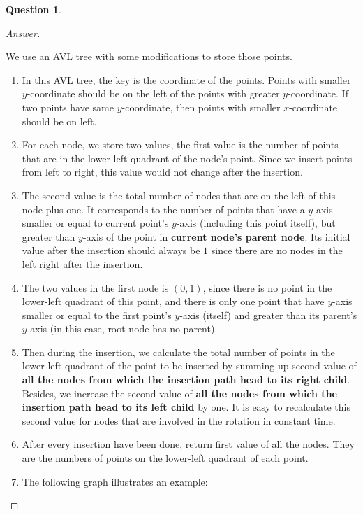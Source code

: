 \documentclass{article}
\theoremstyle{plain}
\newtheorem{question}{Question}
\newenvironment{answer}[1][Answer]
    {\begin{proof}[#1]{$ $}\renewcommand\qedsymbol{$\vartriangle$}}
    {\end{proof}}
\begin{document}
\begin{question}
\end{question}
\begin{answer}
    \begin{enumerate}
    We use an AVL tree with some modifications to store those points.
        \begin{enumerate}
            \item
            In this AVL tree, the key is the coordinate of the points. Points with smaller $y$-coordinate should be on the left of the points with greater $y$-coordinate. If two points have same $y$-coordinate, then points with smaller $x$-coordinate should be on left.
            \item For each node, we store two values, the first value is the number of points that are in the lower left quadrant of the node's point. Since we insert points from left to right, this value would not change after the insertion.
            \item The second value is the total number of nodes that are on the left of this node plus one. It corresponds to the number of points that have a $y$-axis smaller or equal to current point's $y$-axis (including this point itself), but greater than $y$-axis of the point in \textbf{current node's parent node}. Its initial value after the insertion should always be $1$ since there are no nodes in the left right after the insertion.
            \item The two values in the first node is $(0, 1)$, since there is no point in the lower-left quadrant of this point, and there is only one point that have $y$-axis smaller or equal to the first point's $y$-axis (itself) and greater than its parent's $y$-axis (in this case, root node has no parent).
            \item Then during the insertion, we calculate the total number of points in the lower-left quadrant of the  point to be inserted by summing up second value of \textbf{all the nodes from which the insertion path head to its right child}. Besides, we increase the second value of \textbf{all the nodes from which the insertion path head to its left child} by one. It is easy to recalculate this second value for nodes that are involved in the rotation in constant time.
            \item After every insertion have been done, return first value of all the nodes. They are the numbers of points on the lower-left quadrant of each point.
            \item The following graph illustrates an example: \\

\end{enumerate}
\end{enumerate}
\end{answer}
\end{document}
